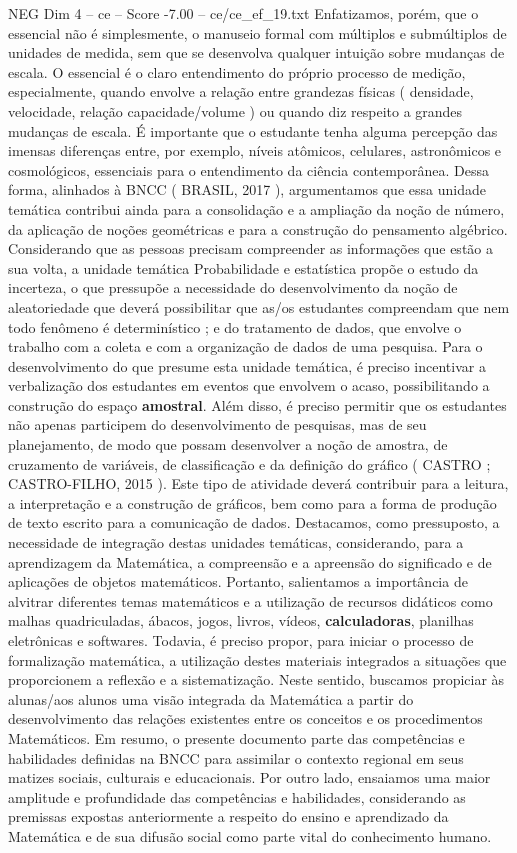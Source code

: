 \begin{textsample}{NEG Dim 4 – ce – Score -7.00 – ce/ce\_ef\_19.txt}
Enfatizamos, porém, que o essencial não é simplesmente, o manuseio formal com múltiplos e submúltiplos de unidades de medida, sem que se desenvolva qualquer intuição sobre mudanças de escala.
O essencial é o claro entendimento do próprio processo de medição, especialmente, quando envolve a relação entre grandezas físicas ( densidade, velocidade, relação capacidade/volume ) ou quando diz respeito a grandes mudanças de escala.
É importante que o estudante tenha alguma percepção das imensas diferenças entre, por exemplo, níveis atômicos, celulares, astronômicos e cosmológicos, essenciais para o entendimento da ciência contemporânea.
Dessa forma, alinhados à BNCC ( BRASIL, 2017 ), argumentamos que essa unidade temática contribui ainda para a consolidação e a ampliação da noção de número, da aplicação de noções geométricas e para a construção do pensamento algébrico.
Considerando que as pessoas precisam compreender as informações que estão a sua volta, a unidade temática Probabilidade e estatística propõe o estudo da incerteza, o que pressupõe a necessidade do desenvolvimento da noção de aleatoriedade que deverá possibilitar que as/os estudantes compreendam que nem todo fenômeno é determinístico ; e do tratamento de dados, que envolve o trabalho com a coleta e com a organização de dados de uma pesquisa.
Para o desenvolvimento do que presume esta unidade temática, é preciso incentivar a verbalização dos estudantes em eventos que envolvem o acaso, possibilitando a construção do espaço \textbf{amostral}.
Além disso, é preciso permitir que os estudantes não apenas participem do desenvolvimento de pesquisas, mas de seu planejamento, de modo que possam desenvolver a noção de amostra, de cruzamento de variáveis, de classificação e da definição do gráfico ( CASTRO ; CASTRO-FILHO, 2015 ).
Este tipo de atividade deverá contribuir para a leitura, a interpretação e a construção de gráficos, bem como para a forma de produção de texto escrito para a comunicação de dados.
Destacamos, como pressuposto, a necessidade de integração destas unidades temáticas, considerando, para a aprendizagem da Matemática, a compreensão e a apreensão do significado e de aplicações de objetos matemáticos.
Portanto, salientamos a importância de alvitrar diferentes temas matemáticos e a utilização de recursos didáticos como malhas quadriculadas, ábacos, jogos, livros, vídeos, \textbf{calculadoras}, planilhas eletrônicas e softwares.
Todavia, é preciso propor, para iniciar o processo de formalização matemática, a utilização destes materiais integrados a situações que proporcionem a reflexão e a sistematização.
Neste sentido, buscamos propiciar às alunas/aos alunos uma visão integrada da Matemática a partir do desenvolvimento das relações existentes entre os conceitos e os procedimentos Matemáticos.
Em resumo, o presente documento parte das competências e habilidades definidas na BNCC para assimilar o contexto regional em seus matizes sociais, culturais e educacionais.
Por outro lado, ensaiamos uma maior amplitude e profundidade das competências e habilidades, considerando as premissas expostas anteriormente a respeito do ensino e aprendizado da Matemática e de sua difusão social como parte vital do conhecimento humano.


\end{textsample}
